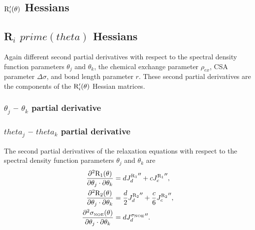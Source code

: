 
\begin{latexonly}
    \subsection{$\mathrm{R}_i'(\theta)$ Hessians}
\end{latexonly}
\begin{htmlonly}
    \subsection{R$_i$ $prime(theta)$ Hessians}
\end{htmlonly}

Again different second partial derivatives with respect to the spectral density function parameters $\theta_j$ and $\theta_k$, the chemical exchange parameter $\rho_{ex}$, CSA parameter $\Delta\sigma$, and bond length parameter $r$.
These second partial derivatives are the components of the $\mathrm{R}_i'(\theta)$ Hessian matrices.


\begin{latexonly}
    \subsubsection{$\theta_j$ -- $\theta_k$ partial derivative}
\end{latexonly}
\begin{htmlonly}
    \subsubsection{$theta_j$ -- $theta_k$ partial derivative}
\end{htmlonly}

The second partial derivatives of the relaxation equations with respect to the spectral density function parameters $\theta_j$ and $\theta_k$ are
\begin{subequations}
\begin{align}
    \frac{\partial^2 \mathrm{R}_1(\theta)}{\partial \theta_j \cdot \partial \theta_k} &= d {J_d^{\mathrm{R}_1}}'' + c {J_c^{\mathrm{R}_1}}'',                      \label{eq: Ri': d2R1/dmfj.dmfk} \\
    \frac{\partial^2 \mathrm{R}_2(\theta)}{\partial \theta_j \cdot \partial \theta_k} &= \frac{d}{2} {J_d^{\mathrm{R}_2}}'' + \frac{c}{6} {J_c^{\mathrm{R}_2}}'',  \label{eq: Ri': d2R2/dmfj.dmfk} \\
    \frac{\partial^2 \sigma_{\scriptscriptstyle \mathrm{NOE}}(\theta)}{\partial \theta_j \cdot \partial \theta_k} &= d {J_d^{\sigma_{\scriptscriptstyle \mathrm{NOE}}}}''.                          \label{eq: Ri': d2sigmaNOE/dmfj.dmfk}
\end{align}
\end{subequations}


